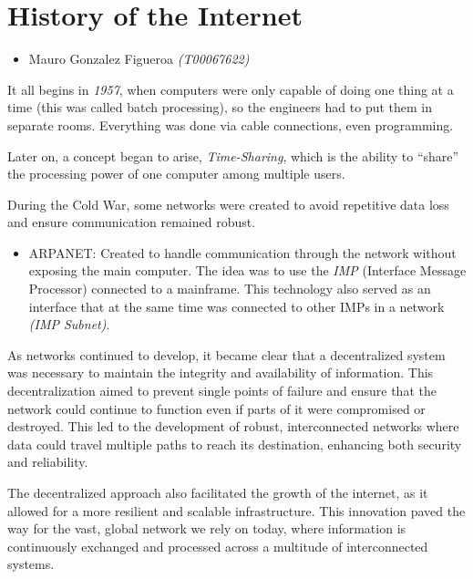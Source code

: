 \documentclass[letterpaper, 12pt]{article}
\begin{document}
\section*{History of the Internet}

\noindent\makebox[\linewidth]{\rule{\textwidth}{0.4pt}}

\begin{itemize}[label=$\triangleright$]
      \item Mauro Gonzalez Figueroa \textit{(T00067622)}
\end{itemize}

\noindent\makebox[\linewidth]{\rule{\textwidth}{0.4pt}}

\nocite{*}

It all begins in \textit{1957}, when computers were only capable of doing one
thing at a time (this was called batch processing), so the engineers had to put
them in separate rooms. Everything was done via cable connections, even
programming.

Later on, a concept began to arise, \textit{Time-Sharing}, which is the ability
to ``share'' the processing power of one computer among multiple users.

During the Cold War, some networks were created to avoid repetitive data loss
and ensure communication remained robust.

\begin{itemize}
      \item ARPANET:\@{} Created to handle communication through the network without
            exposing the main computer. The idea was to use the \textit{IMP} (Interface
            Message Processor) connected to a mainframe. This technology also served as an
            interface that at the same time was connected to other IMPs in a network
            \textit{(IMP Subnet)}.
\end{itemize}

As networks continued to develop, it became clear that a decentralized system
was necessary to maintain the integrity and availability of information. This
decentralization aimed to prevent single points of failure and ensure that the
network could continue to function even if parts of it were compromised or
destroyed. This led to the development of robust, interconnected networks where
data could travel multiple paths to reach its destination, enhancing both
security and reliability.

The decentralized approach also facilitated the growth of the internet, as it
allowed for a more resilient and scalable infrastructure. This innovation paved
the way for the vast, global network we rely on today, where information is
continuously exchanged and processed across a multitude of interconnected
systems.

\printbibliography
\end{document}
